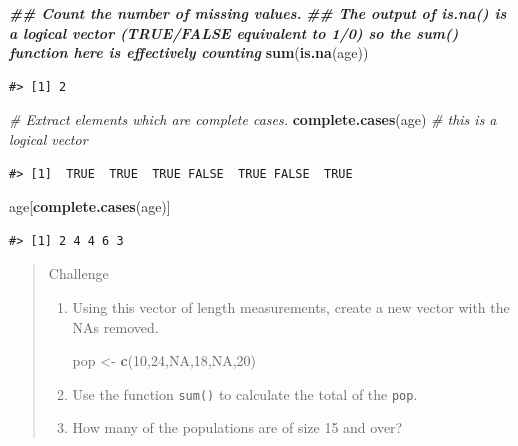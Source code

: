 \documentclass[
]{book}
\newenvironment{Shaded}{\begin{snugshade}}{\end{snugshade}}
\newcommand{\CommentTok}[1]{\textcolor[rgb]{0.56,0.35,0.01}{\textit{#1}}}
\newcommand{\ConstantTok}[1]{\textcolor[rgb]{0.56,0.35,0.01}{#1}}
\newcommand{\DecValTok}[1]{\textcolor[rgb]{0.00,0.00,0.81}{#1}}
\newcommand{\DocumentationTok}[1]{\textcolor[rgb]{0.56,0.35,0.01}{\textbf{\textit{#1}}}}
\newcommand{\FunctionTok}[1]{\textcolor[rgb]{0.13,0.29,0.53}{\textbf{#1}}}
\newcommand{\NormalTok}[1]{#1}
\newcommand{\OtherTok}[1]{\textcolor[rgb]{0.56,0.35,0.01}{#1}}
\begin{document}
\begin{Shaded}
\begin{Highlighting}[]
\DocumentationTok{\#\# Count the number of missing values.}
\DocumentationTok{\#\# The output of is.na() is a logical vector (TRUE/FALSE equivalent to 1/0) so the sum() function here is effectively counting}
\FunctionTok{sum}\NormalTok{(}\FunctionTok{is.na}\NormalTok{(age))}
\end{Highlighting}
\end{Shaded}

\begin{verbatim}
#> [1] 2
\end{verbatim}

\begin{Shaded}
\begin{Highlighting}[]
\CommentTok{\# Extract elements which are complete cases.}
\FunctionTok{complete.cases}\NormalTok{(age) }\CommentTok{\# this is a logical vector}
\end{Highlighting}
\end{Shaded}

\begin{verbatim}
#> [1]  TRUE  TRUE  TRUE FALSE  TRUE FALSE  TRUE
\end{verbatim}

\begin{Shaded}
\begin{Highlighting}[]
\NormalTok{age[}\FunctionTok{complete.cases}\NormalTok{(age)]}
\end{Highlighting}
\end{Shaded}

\begin{verbatim}
#> [1] 2 4 4 6 3
\end{verbatim}

\begin{quote}
Challenge

\begin{enumerate}
\def\labelenumi{\arabic{enumi}.}
\item
  Using this vector of length measurements, create a new vector with the NAs
  removed.

\begin{Shaded}
\begin{Highlighting}[]
\NormalTok{pop }\OtherTok{\textless{}{-}} \FunctionTok{c}\NormalTok{(}\DecValTok{10}\NormalTok{,}\DecValTok{24}\NormalTok{,}\ConstantTok{NA}\NormalTok{,}\DecValTok{18}\NormalTok{,}\ConstantTok{NA}\NormalTok{,}\DecValTok{20}\NormalTok{)}
\end{Highlighting}
\end{Shaded}
\item
  Use the function \texttt{sum()} to calculate the total of the \texttt{pop}.
\item
  How many of the populations are of size 15 and over?
\end{enumerate}
\end{quote}
\end{document}

